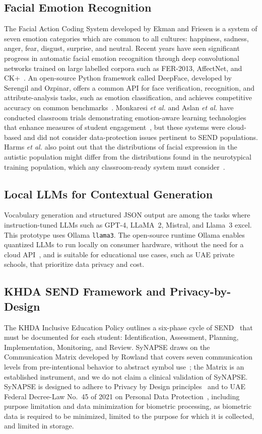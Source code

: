 \documentclass[conference]{IEEEtran}
\begin{document}
\subsection{Facial Emotion Recognition}
The Facial Action Coding System developed by Ekman and Friesen is a system of seven emotion categories which are common to all cultures: happiness, sadness, anger, fear, disgust, surprise, and neutral. Recent years have seen significant progress in automatic facial emotion recognition through deep convolutional networks trained on large labelled corpora such as FER-2013, AffectNet, and CK+~\cite{b5}. An open-source Python framework called DeepFace, developed by Serengil and Ozpinar, offers a common API for face verification, recognition, and attribute-analysis tasks, such as emotion classification, and achieves competitive accuracy on common benchmarks~\cite{b6}. Monkaresi \emph{et al.} and Aslan \emph{et al.} have conducted classroom trials demonstrating emotion-aware learning technologies that enhance measures of student engagement~\cite{b7,b8}, but these systems were cloud-based and did not consider data-protection issues pertinent to SEND populations. Harms \emph{et al.} also point out that the distributions of facial expression in the autistic population might differ from the distributions found in the neurotypical training population, which any classroom-ready system must consider~\cite{b9}.

\subsection{Local LLMs for Contextual Generation}
Vocabulary generation and structured JSON output are among the tasks where instruction-tuned LLMs such as GPT-4, LLaMA~2, Mistral, and Llama~3 excel. This prototype uses Ollama \texttt{llama3}. The open-source runtime Ollama enables quantized LLMs to run locally on consumer hardware, without the need for a cloud API~\cite{b10}, and is suitable for educational use cases, such as UAE private schools, that prioritize data privacy and cost.

\subsection{KHDA SEND Framework and Privacy-by-Design}
The KHDA Inclusive Education Policy outlines a six-phase cycle of SEND~\cite{b11} that must be documented for each student: Identification, Assessment, Planning, Implementation, Monitoring, and Review. SyNAPSE draws on the Communication Matrix developed by Rowland that covers seven communication levels from pre-intentional behavior to abstract symbol use~\cite{b12}; the Matrix is an established instrument, and we do not claim a clinical validation of SyNAPSE. SyNAPSE is designed to adhere to Privacy by Design principles~\cite{b13} and to UAE Federal Decree-Law No.~45 of 2021 on Personal Data Protection~\cite{b14}, including purpose limitation and data minimization for biometric processing, as biometric data is required to be minimized, limited to the purpose for which it is collected, and limited in storage.
\end{document}
